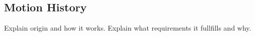 \subsection{Motion History}
Explain origin and how it works.
Explain what requirements it fullfills and why.
